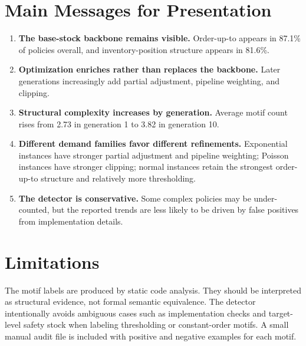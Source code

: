 \documentclass[11pt]{article}
\begin{document}
\section{Main Messages for Presentation}
\begin{enumerate}
  \item \textbf{The base-stock backbone remains visible.} Order-up-to appears in 87.1\% of policies overall, and inventory-position structure appears in 81.6\%.
  \item \textbf{Optimization enriches rather than replaces the backbone.} Later generations increasingly add partial adjustment, pipeline weighting, and clipping.
  \item \textbf{Structural complexity increases by generation.} Average motif count rises from 2.73 in generation 1 to 3.82 in generation 10.
  \item \textbf{Different demand families favor different refinements.} Exponential instances have stronger partial adjustment and pipeline weighting; Poisson instances have stronger clipping; normal instances retain the strongest order-up-to structure and relatively more thresholding.
  \item \textbf{The detector is conservative.} Some complex policies may be under-counted, but the reported trends are less likely to be driven by false positives from implementation details.
\end{enumerate}

\section{Limitations}
The motif labels are produced by static code analysis. They should be interpreted as structural evidence, not formal semantic equivalence. The detector intentionally avoids ambiguous cases such as implementation checks and target-level safety stock when labeling thresholding or constant-order motifs. A small manual audit file is included with positive and negative examples for each motif.
\end{document}
